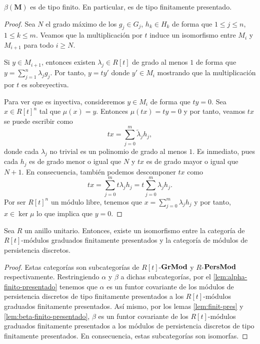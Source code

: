 \begin{lema}
	\label{lem:beta-finito-presentado}
	\(\beta(\mathbf{M})\) es de tipo finito. En particular, es de tipo finitamente presentado.
\end{lema}
\begin{proof}
	Sea \(N\) el grado máximo de los \(g_j \in G_j\), \(h_k \in H_k\) de forma que \(1 \leq j \leq n\), \(1 \leq k \leq m\). Veamos que la multiplicación por \(t\) induce un isomorfismo entre \(M_i\) y \(M_{i+1}\) para todo \(i \geq N\).
	
	Si \(y \in M_{i+1}\), entonces existen \(\lambda_j \in R[t]\) de grado al menos \(1\) de forma que \(y = \sum_{j=1}^n \lambda_j g_j\). Por tanto, \(y = ty'\) donde \(y' \in M_i\) mostrando que la multiplicación por \(t\) es sobreyectiva.
	
	Para ver que es inyectiva, consideremos \(y \in M_i\) de forma que \(ty = 0\). Sea \(x \in R[t]^n\) tal que \(\mu(x) = y\). Entonces \(\mu(tx) = ty = 0\) y por tanto, veamos \(tx\) se puede escribir como
	\[
		tx = \sum_{j=0}^m \tilde{\lambda}_j h_j,
	\]
	donde cada \(\lambda_j\) no trivial es un polinomio de grado al menos \(1\). Es inmediato, pues cada \(h_j\) es de grado menor o igual que \(N\) y \(tx\) es de grado mayor o igual que \(N+1\). En consecuencia, también podemos descomponer \(tx\) como
	\[
		tx = \sum_{j=0}^m t \lambda_j h_j = t \sum_{j=0}^m \lambda_j h_j.
	\]
	Por ser \(R[t]^n\) un módulo libre, tenemos que \( x = \sum_{j=0}^m \lambda_j h_j\) y por tanto, \(x \in \ker \mu\) lo que implica que \(y = 0\).
\end{proof}

\begin{teorema}
	\label{teo:correspondence}
	Sea \( R \) un anillo unitario. Entonces, existe un isomorfismo entre la categoría de \(R[t]\)-módulos graduados finitamente presentados y la categoría de módulos de persistencia discretos.
\end{teorema}
\begin{proof}
	Estas categorías son subcategorías de \(R[t]\)-\(\mathbf{GrMod}\) y \(R\)-\(\mathbf{PersMod}\) respectivamente. Restringiendo \(\alpha\) y \(\beta\) a dichas subcategorías, por el \autoref{lem:alpha-finito-presentado} tenemos que \(\alpha\) es un funtor covariante de los módulos de persistencia discretos de tipo finitamente presentados a los \(R[t]\)-módulos graduados finitamente presentados. Así mismo, por los lemas \ref{lem:finit-pres} y \ref{lem:beta-finito-presentado}, \(\beta\) es un funtor covariante de los \(R[t]\)-módulos graduados finitamente presentados a los módulos de persistencia discretos de tipo finitamente presentados. En consecuencia, estas subcategorías son isomorfas.
\end{proof}


